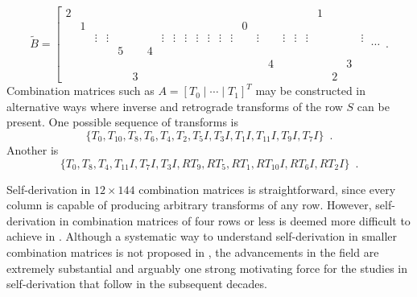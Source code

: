 \begin{example}
	\begin{equation}
    	\tilde{B} = \left[
    	\begin{array}{cccccccccccc|cccccccccccc|}
        	2 &&&&&&&&&&&&&&&&&&&& 1 &&& \\
        	& 1 &&&&&&&&&&&&& 0 &&&&&&&&& \\
        	&& \vdots & \vdots &&&& \vdots & \vdots & \vdots & \vdots & \vdots & \vdots & \vdots && \vdots && \vdots & \vdots & \vdots &&&& \vdots \\
        	&&&& 5 && \boxed{4} &&&&&&&&&&&&&&&&& \\
        	&&&&&&&&&&&&&&&& \boxed{4} &&&&&& 3 & \\
        	&&&&& 3 &&&&&&&&&&&&&&&& 2 &&
    	\end{array}
    	\; \cdots \right. \enspace.
    \end{equation}
    Combination matrices such as $A = [T_0 \; | \; \cdots \; | \; T_1]^T$ may be constructed in alternative ways where inverse and retrograde transforms of the row $S$ can be present. One possible sequence of transforms is
	\begin{equation}
		\{ T_0, T_{10}, T_{8}, T_{6}, T_{4}, T_{2}, T_{5}I, T_{3}I, T_{1}I, T_{11}I, T_{9}I, T_{7}I \} \enspace .
	\end{equation}
	Another is
	\begin{equation}
		\{ T_0, T_{8}, T_{4}, T_{11}I, T_{7}I, T_{3}I, RT_{9}, RT_{5}, RT_{1}, RT_{10}I, RT_{6}I, RT_{2}I \} \enspace .
	\end{equation}
\end{example}

Self-derivation in $12 \times 144$ combination matrices is straightforward, since every column is capable of producing arbitrary transforms of any row. However, self-derivation in combination matrices of four rows or less is deemed more difficult to achieve in \cite[108]{Westergaard1966}. Although a systematic way to understand self-derivation in smaller combination matrices is not proposed in \cite{Westergaard1966}, the advancements in the field are extremely substantial and arguably one strong motivating force for the studies in self-derivation that follow in the subsequent decades.


